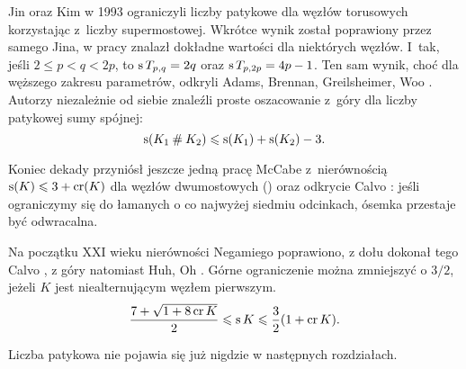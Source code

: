 Jin oraz Kim w 1993 ograniczyli liczby patykowe dla węzłów torusowych korzystając z~liczby supermostowej.
%
%
Wkrótce wynik został poprawiony przez samego Jina, w pracy \cite{jin1997} znalazł dokładne wartości dla niektórych węzłów.
I~tak, jeśli $2 \le p < q < 2p$, to $\operatorname{s} T_{p,q} = 2q$ oraz $\operatorname{s} T_{p, 2p} = 4p-1$.
Ten sam wynik, choć dla węższego zakresu parametrów, odkryli Adams, Brennan, Greilsheimer, Woo \cite{greilsheimer1997}.
%
%
%
%
%
Autorzy niezależnie od siebie znaleźli proste oszacowanie z~góry dla liczby patykowej sumy spójnej:
\label{stick_bounded_factors}%
\begin{equation}
    \operatorname{s}(K_1 \mathbin{\#} K_2) \leqslant \operatorname{s}(K_1) + \operatorname{s}(K_2) - 3.
\end{equation}

Koniec dekady przyniósł jeszcze jedną pracę McCabe z~nierównością $\operatorname{s}(K) \leqslant 3 + \operatorname{cr} (K)$ dla węzłów dwumostowych (\cite{mccabe1998}) oraz odkrycie Calvo \cite{calvo2001}: jeśli ograniczymy się do łamanych o co najwyżej siedmiu odcinkach, ósemka przestaje być odwracalna.
%
%

Na początku XXI wieku nierówności Negamiego poprawiono, z dołu dokonał tego Calvo \cite{calvo2001}, z góry natomiast Huh, Oh \cite{huh2011}.
%
%
%
Górne ograniczenie można zmniejszyć o $3/2$, jeżeli $K$ jest niealternującym węzłem pierwszym.
\begin{equation}
    \frac{7+\sqrt{1 + 8 \operatorname{cr} K}}{2} \leqslant \operatorname{s} K \leqslant \frac{3}{2} (1 + \operatorname{cr} K).
\end{equation}

Liczba patykowa nie pojawia się już nigdzie w następnych rozdziałach.


%


